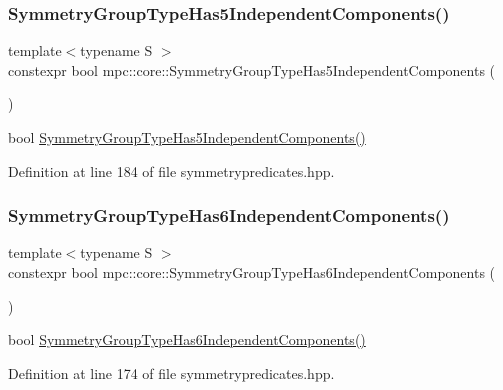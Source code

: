 \subsubsection{\texorpdfstring{Symmetry\+Group\+Type\+Has5\+Independent\+Components()}{SymmetryGroupTypeHas5IndependentComponents()}}
{\footnotesize\ttfamily template$<$typename S $>$ \\
constexpr bool mpc\+::core\+::\+Symmetry\+Group\+Type\+Has5\+Independent\+Components (\begin{DoxyParamCaption}{ }\end{DoxyParamCaption})\hspace{0.3cm}{\ttfamily [inline]}}

bool \mbox{\hyperlink{namespacempc_1_1core_acb4d9bceab008077200a0a4c9ab91c69}{Symmetry\+Group\+Type\+Has5\+Independent\+Components()}} 

Definition at line 184 of file symmetrypredicates.\+hpp.

\mbox{\label{namespacempc_1_1core_a148ec307192d560f052a1cc0c8dffb7c}} 
\subsubsection{\texorpdfstring{Symmetry\+Group\+Type\+Has6\+Independent\+Components()}{SymmetryGroupTypeHas6IndependentComponents()}}
{\footnotesize\ttfamily template$<$typename S $>$ \\
constexpr bool mpc\+::core\+::\+Symmetry\+Group\+Type\+Has6\+Independent\+Components (\begin{DoxyParamCaption}{ }\end{DoxyParamCaption})\hspace{0.3cm}{\ttfamily [inline]}}

bool \mbox{\hyperlink{namespacempc_1_1core_a148ec307192d560f052a1cc0c8dffb7c}{Symmetry\+Group\+Type\+Has6\+Independent\+Components()}} 

Definition at line 174 of file symmetrypredicates.\+hpp.

\mbox{\label{namespacempc_1_1core_accdfd67f26b27f03bbab68358d954bb0}} 
